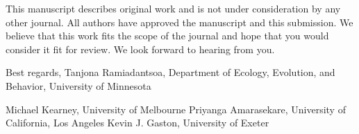 
This manuscript describes original work and is not under consideration by any other journal.
All authors have approved the manuscript and this submission.
We believe that this work fits the scope of the journal and hope that you would consider it fit for review.
We look forward to hearing from you.

Best regards,
Tanjona Ramiadantsoa,
Department of Ecology, Evolution, and Behavior, University of Minnesota

Michael Kearney, University of Melbourne
Priyanga Amarasekare, University of California, Los Angeles
Kevin J. Gaston, University of Exeter
